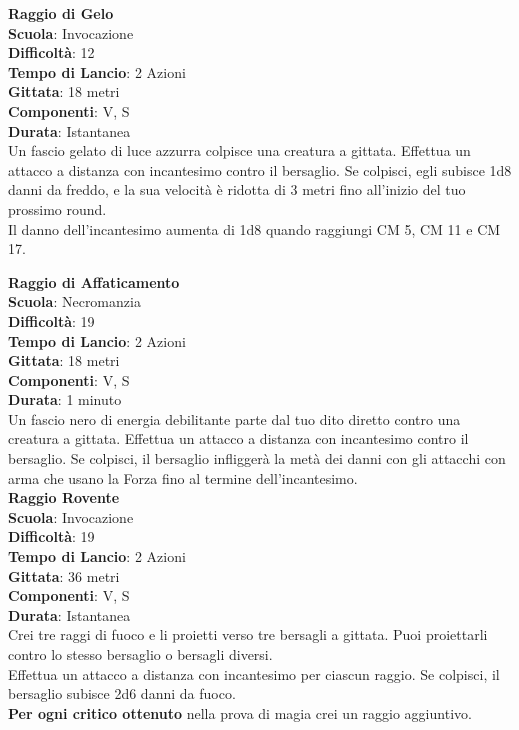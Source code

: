 \begin{multicols}{2}
\medskip\textbf{Raggio di Gelo}\\
\textbf{Scuola}: Invocazione\\
\textbf{Difficoltà}: 12\\
\textbf{Tempo di Lancio}: 2 Azioni\\
\textbf{Gittata}: 18 metri\\
\textbf{Componenti}: V, S\\
\textbf{Durata}: Istantanea\\
Un fascio gelato di luce azzurra colpisce una creatura a gittata. Effettua un attacco a distanza con incantesimo contro il bersaglio. Se colpisci, egli subisce 1d8 danni da freddo, e la sua velocità è ridotta di 3 metri fino all'inizio del tuo prossimo round. \\
Il danno dell'incantesimo aumenta di 1d8 quando raggiungi CM 5, CM 11 e CM 17.

\medskip\textbf{Raggio di Affaticamento}\\
\textbf{Scuola}: Necromanzia\\
\textbf{Difficoltà}: 19\\
\textbf{Tempo di Lancio}: 2 Azioni\\
\textbf{Gittata}: 18 metri\\
\textbf{Componenti}: V, S\\
\textbf{Durata}: 1 minuto\\
Un fascio nero di energia debilitante parte dal tuo dito diretto contro una creatura a gittata. Effettua un attacco a distanza con incantesimo contro il bersaglio. Se colpisci, il bersaglio infliggerà la metà dei danni con gli attacchi con arma che usano la Forza fino al termine dell'incantesimo.\\ 

\medskip\textbf{Raggio Rovente}\\
\textbf{Scuola}: Invocazione\\
\textbf{Difficoltà}: 19\\
\textbf{Tempo di Lancio}: 2 Azioni\\
\textbf{Gittata}: 36 metri\\
\textbf{Componenti}: V, S\\
\textbf{Durata}: Istantanea\\
Crei tre raggi di fuoco e li proietti verso tre bersagli a gittata. Puoi proiettarli contro lo stesso bersaglio o bersagli diversi.\\
Effettua un attacco a distanza con incantesimo per ciascun raggio. Se colpisci, il bersaglio subisce 2d6 danni da fuoco.\\
\textbf{Per ogni critico ottenuto} nella prova di magia crei un raggio aggiuntivo.


\end{multicols}
